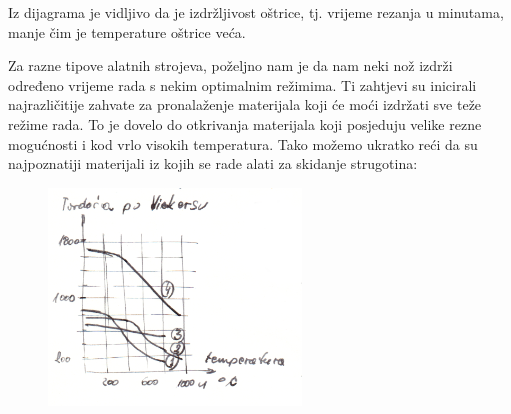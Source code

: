 \documentclass[a4paper,12pt]{article}
\numberwithin{figure}{section}
\begin{document}
Iz dijagrama je vidljivo da je izdržljivost oštrice, tj. vrijeme rezanja u minutama, manje čim je temperature oštrice veća.\par 
Za razne tipove alatnih strojeva, poželjno nam je da nam neki nož izdrži određeno vrijeme rada s nekim optimalnim režimima. Ti zahtjevi su inicirali najrazličitije zahvate za pronalaženje materijala koji će moći izdržati sve teže režime rada. To je dovelo do otkrivanja materijala koji posjeduju velike rezne mogućnosti i kod vrlo visokih temperatura. Tako možemo ukratko reći da su najpoznatiji materijali iz kojih se rade alati za skidanje strugotina:
\begin{figure}[!h]
\centering
\includegraphics[width=0.6\textwidth]{image_12-1.png}
\end{figure}
\FloatBarrier
\end{document}
